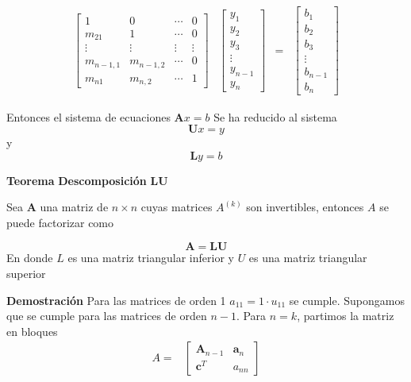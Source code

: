 \documentclass[
]{article}
\begin{document}
\begin{equation}
\begin{array}{cccc}
   \begin{bmatrix} 
       1        &    0    & \cdots & 0   \\
       m_{21}   &    1    & \cdots & 0   \\
     \vdots     & \vdots  & \vdots & \vdots \\
     m_{n-1,1}     & m_{n-1,2} & \cdots & 0 \\
     m_{n1}     & m_{n,2} & \cdots & 1  
  \end{bmatrix} & 
  \begin{bmatrix} 
       y_1        \\  
       y_2        \\
       y_3        \\
     \vdots       \\
     y_{n-1}      \\
     y_{n}
  \end{bmatrix} &
  = 
  &
  \begin{bmatrix} 
       b_1        \\  
       b_2        \\
       b_3        \\
     \vdots       \\
     b_{n-1}      \\
     b_{n}
  \end{bmatrix} 
\end{array}
\end{equation}

Entonces el sistema de ecuaciones \(\mathbf{A}x=b\) Se ha reducido al
sistema \[
\mathbf{U}x = y
\] y \[
\mathbf{L}y = b
\]

\textbf{Teorema} \textbf{Descomposición} \textbf{LU}

Sea \(\mathbf{A}\) una matriz de \(n\times n\) cuyas matrices
\(A^{(k)}\) son invertibles, entonces \(A\) se puede factorizar como

\begin{equation}
 \mathbf{A} = \mathbf{L}\mathbf{U}
\end{equation} En donde \(L\) es una matriz triangular inferior y \(U\)
es una matriz triangular superior

\textbf{Demostración} Para las matrices de orden 1
\(a_{11}=1\cdot u_{11}\) se cumple. Supongamos que se cumple para las
matrices de orden \(n-1\). Para \(n= k\), partimos la matriz en bloques
\begin{equation*}
\begin{array}{cc}
  A = & \begin{bmatrix} 
          \mathbf{A}_{n-1} & \mathbf{a}_n \\
          \mathbf{c}^{T}   &  a_{nn}
  \end{bmatrix} 
\end{array}
\end{equation*}
\end{document}
